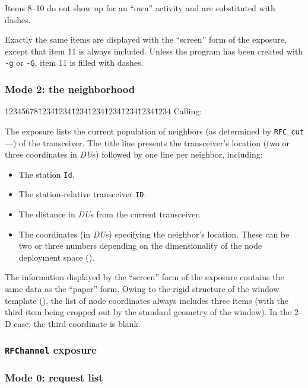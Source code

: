 Items 8--10 do not show up for an ``own'' activity and are substituted with
dashes.

Exactly the same items are displayed with the ``screen''
form of the exposure, except that item 11 is always included.
Unless the program has been created with {\tt -g} or {\tt -G}, item 11 is filled
with dashes.

\subsubsection*{Mode 2: the neighborhood}

{\tt\begin{tabbing}
12345678\=1234\=1234\=1234\=1234\=1234\=1234\=1234\=1234\kill
{\rm Calling:}
\end{tabbing}}

The exposure lists the current population of neighbors (as determined by
{\tt RFC\_cut}---) of the transceiver.
The title line presents the transceiver's location (two or three
coordinates in {\em DU\/}s) followed by one line per neighbor, including:

\begin{itemize}
\item
The station {\tt Id}.
\item
The station-relative transceiver {\tt ID}.
\item 
The distance in {\em DU\/}s from the current transceiver.
\item
The coordinates (in {\em DU\/}s) specifying the neighbor's location.
These can be two or three numbers depending on the dimensionality of the
node deployment space ().
\end{itemize}

The information displayed by the ``screen'' form of the exposure contains the
same data as the ``paper'' form.
Owing to the rigid structure of the window template (), the
list of node coordinates always includes three items (with the third item
being cropped out by the standard geometry of the window).
In the 2-D case, the third coordinate is blank.

\subsubsection{{\tt RFChannel} exposure}
\label{rm_ex_se_rc}

\subsubsection*{Mode 0: request list}

